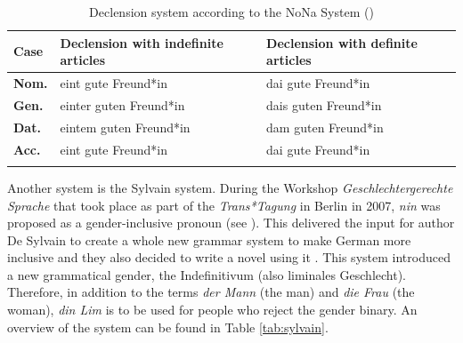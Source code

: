 \begin{table}
        \caption[Declension system according to the NoNa System]{Declension system according to the NoNa System (\cite{NoNa})}
    \label{tab:adjectivedeclensionnona}
    \begin{tabularx}{\textwidth}{lQQ}
    \lsptoprule
         {Case} &  {Declension with indefinite   articles}  &  {Declension with definite   articles} \\
\midrule
         \textbf{Nom.} & eint gute Freund*in & dai gute Freund*in \\
         \textbf{Gen.} & einter guten Freund*in & dais guten Freund*in \\
         \textbf{Dat.} & eintem guten Freund*in & dam guten Freund*in \\
         \textbf{Acc.} & eint gute Freund*in & dai gute Freund*in \\
\lspbottomrule
    \end{tabularx}
\end{table}

Another system is the Sylvain system. During the Workshop \textit{Geschlechtergerechte Sprache} that took place as part of the \textit{Trans*Tagung} in Berlin in 2007, \textit{nin} was proposed as a gender-inclusive pronoun (see \cite{baumgartinger2008lieb}). This delivered the input for author De Sylvain to create a whole new grammar system to make German more inclusive and they also decided to write a novel using it \citep[40]{de2008sylvain}. This system introduced a new grammatical gender, the Indefinitivum (also liminales Geschlecht). Therefore, in addition to the terms \textit{der Mann} (the man) and \textit{die Frau} (the woman), \textit{din Lim} is to be used for people who reject the gender binary. An overview of the system can be found in Table \ref{tab:sylvain}.

\begin{table}[ht]
    \caption[Pronouns and articles according to the Sylvain system]{Pronouns and articles according to the Sylvain system (\cite{de2008sylvain})}
    \label{tab:sylvain}
\end{table}

